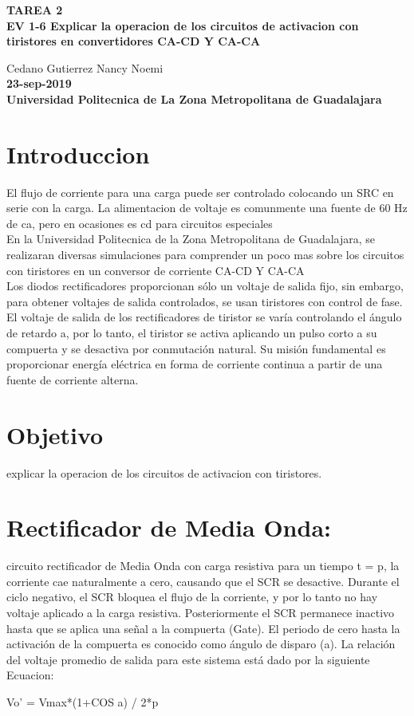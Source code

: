 \documentclass[11pt,a4paper]{article}
\begin{document}
\begin{center}
\textbf{TAREA 2}\\
\textbf{EV 1-6 Explicar la operacion de los circuitos de activacion con tiristores en convertidores CA-CD Y CA-CA}
\end{center}

\begin{center}
Cedano Gutierrez Nancy Noemi\\
\textbf{23-sep-2019}\\
\textbf{Universidad Politecnica de La Zona Metropolitana de Guadalajara}
\end{center}

\section{Introduccion}
El flujo de corriente para una carga puede ser controlado colocando un SRC en serie con la carga. La alimentacion de voltaje es comunmente una fuente de 60 Hz de ca, pero en ocasiones es cd para circuitos especiales\\
En la Universidad Politecnica de la Zona Metropolitana de Guadalajara, se realizaran diversas simulaciones para comprender un poco mas sobre los circuitos con tiristores en un conversor de corriente CA-CD Y CA-CA\\
Los diodos rectificadores proporcionan sólo un voltaje de salida fijo, sin embargo, para obtener voltajes de salida controlados, se usan tiristores con control de fase. 
El voltaje de salida de los rectificadores de tiristor se varía controlando el ángulo de retardo a, por lo tanto, el tiristor se activa aplicando un pulso corto a su compuerta y se desactiva por conmutación natural.
Su misión fundamental es proporcionar energía eléctrica en forma de corriente continua a partir de una fuente de corriente alterna. \\
\section{Objetivo}
explicar la operacion de los circuitos de activacion con tiristores.

\section{Rectificador de Media Onda:}
circuito rectificador de Media Onda con carga resistiva para un tiempo t = p, la corriente cae naturalmente a cero, causando que el SCR se desactive. Durante el ciclo negativo, el SCR bloquea el flujo de la corriente, y por lo tanto no hay voltaje aplicado a la carga resistiva. Posteriormente el SCR permanece inactivo hasta que se aplica una señal a la compuerta (Gate). El periodo de cero hasta la activación de la compuerta es conocido como ángulo de disparo (a). La relación del voltaje promedio de salida para este sistema está dado por la siguiente Ecuacion:
\begin{center}
Vo' = Vmax*(1+COS a) / 2*p\\
\end{center}
\end{document}
